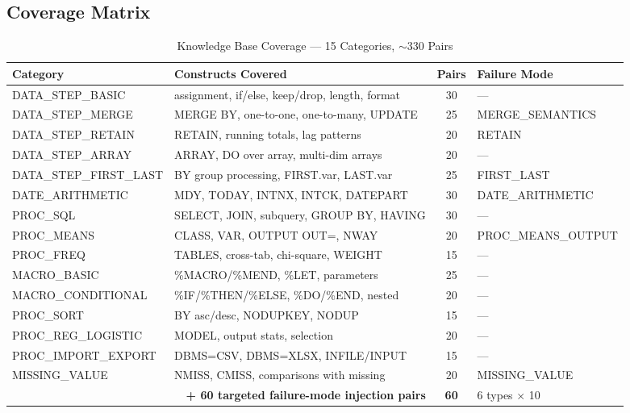 \documentclass[11pt,a4paper]{article}
\begin{document}
\subsection{Coverage Matrix}

\begin{table}[H]
\centering
\caption{Knowledge Base Coverage — 15 Categories, $\sim$330 Pairs}
\renewcommand{\arraystretch}{1.2}
\small
\begin{tabularx}{\textwidth}{@{} l X c l @{}}
\toprule
\textbf{Category} & \textbf{Constructs Covered} & \textbf{Pairs} & \textbf{Failure Mode} \\
\midrule
DATA\_STEP\_BASIC & assignment, if/else, keep/drop, length, format & 30 & — \\
DATA\_STEP\_MERGE & MERGE BY, one-to-one, one-to-many, UPDATE & 25 & MERGE\_SEMANTICS \\
DATA\_STEP\_RETAIN & RETAIN, running totals, lag patterns & 20 & RETAIN \\
DATA\_STEP\_ARRAY & ARRAY, DO over array, multi-dim arrays & 20 & — \\
DATA\_STEP\_FIRST\_LAST & BY group processing, FIRST.var, LAST.var & 25 & FIRST\_LAST \\
DATE\_ARITHMETIC & MDY, TODAY, INTNX, INTCK, DATEPART & 30 & DATE\_ARITHMETIC \\
PROC\_SQL & SELECT, JOIN, subquery, GROUP BY, HAVING & 30 & — \\
PROC\_MEANS & CLASS, VAR, OUTPUT OUT=, NWAY & 20 & PROC\_MEANS\_OUTPUT \\
PROC\_FREQ & TABLES, cross-tab, chi-square, WEIGHT & 15 & — \\
MACRO\_BASIC & \%MACRO/\%MEND, \%LET, parameters & 25 & — \\
MACRO\_CONDITIONAL & \%IF/\%THEN/\%ELSE, \%DO/\%END, nested & 20 & — \\
PROC\_SORT & BY asc/desc, NODUPKEY, NODUP & 15 & — \\
PROC\_REG\_LOGISTIC & MODEL, output stats, selection & 20 & — \\
PROC\_IMPORT\_EXPORT & DBMS=CSV, DBMS=XLSX, INFILE/INPUT & 15 & — \\
MISSING\_VALUE & NMISS, CMISS, comparisons with missing & 20 & MISSING\_VALUE \\
\midrule
\multicolumn{2}{r}{\textbf{+ 60 targeted failure-mode injection pairs}} & \textbf{60} & 6 types $\times$ 10 \\
\bottomrule
\end{tabularx}
\end{table}
\end{document}
